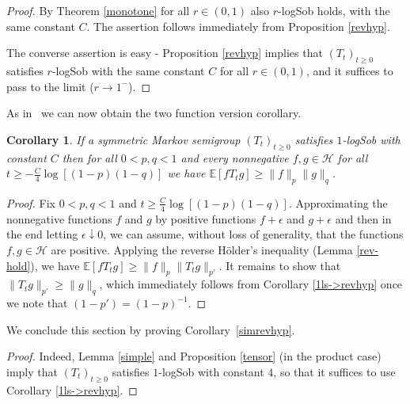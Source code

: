 \documentclass[11pt]{amsart}
\newcommand{\E}{\mathbb{E}}
\newcommand{\1}{\mathbf{1}}
\def\E{{\mathbb E}}
\def\H{{\mathcal{H}}}
\theoremstyle{definition}
\theoremstyle{plain}
\newtheorem{corollary}[example]{Corollary}
\theoremstyle{remark}
\numberwithin{equation}{section}
\begin{document}
\begin{proof}
By Theorem \ref{monotone} for all $r \in (0,1)$ also $r$-logSob holds, with the same constant $C$. The assertion follows immediately from Proposition \ref{revhyp}.

The converse assertion is easy - Proposition \ref{revhyp} implies that $(T_{t})_{t \geq 0}$ satisfies $r$-logSob with the same constant $C$ for all $r \in (0,1)$, and it suffices to pass to the limit ($r \to 1^{-}$).
\end{proof}

As in~\cite{Borell82,Mossel06} we can now obtain the two function version corollary.

\begin{corollary} \label{cor:twofunction_general}
If a symmetric Markov semigroup $(T_{t})_{t \geq 0}$ satisfies $1$-logSob with constant $C$ then for all
$0< p, q <1$ and every nonnegative $f, g \in \H$ for all
$t \geq -\frac{C}{4}\log[ (1-p)(1-q)]$ we have
$ \E [f T_t g ]  \geq \| f\|_{p} \| g\|_q$.
\end{corollary}

\begin{proof}
Fix $0 <p, q<1$ and $t \geq \frac{C}{4}\log[ (1-p)(1-q)]$. Approximating the nonnegative functions $f$ and $g$ by positive functions $f+ \epsilon$ and $g+\epsilon$ and then in the end letting $\epsilon \downarrow 0$,  we can assume, without loss of generality, that  the functions $f, g \in \H$ are positive.
Applying the reverse H\"{o}lder's inequality (Lemma \ref{rev-hold}), we have $\E [f T_t g] \ge \|f \|_p \|T_t g \|_{p'}$. It remains to show that $ \| T_t g \|_{p'}   \ge \| g \|_{q}$,
which immediately follows from Corollary \ref{1ls->revhyp} once we note that $ (1- p') = (1-p)^{-1}$.
\end{proof}

We conclude this section by proving Corollary~\ref{simrevhyp}.

\begin{proof}
Indeed, Lemma \ref{simple} and Proposition \ref{tensor}
(in the product case) imply that $(T_{t})_{t \geq 0}$ satisfies $1$-logSob with constant $4$, so that it suffices to use Corollary \ref{1ls->revhyp}.
\end{proof}
\end{document}
